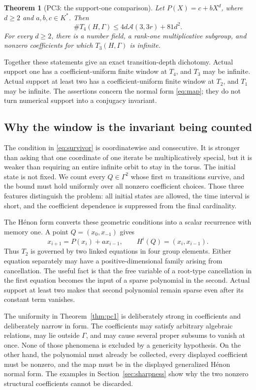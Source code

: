 \documentclass[11pt]{article}
\newtheorem{theorem}{Theorem}[section]
\theoremstyle{definition}
\newcommand{\Acal}{\mathcal A}
\newcommand{\card}{\#}
\begin{document}
\begin{theorem}[PC3: the support-one comparison]
\label{thm:pc3}
Let \(P(X)=c+bX^d\), where \(d\geq2\) and \(a,b,c\in K^*\). Then
\begin{equation}
 \boxed{
 \card T_4(H,\Gamma)
 \leq4d\Acal(3,3r)+81d^2.
 }
 \label{eq:pc3-bound}
\end{equation}
For every \(d\geq2\), there is a number field, a rank-one multiplicative subgroup, and nonzero coefficients for which \(T_3(H,\Gamma)\) is infinite.
\end{theorem}

Together these statements give an exact transition-depth dichotomy. Actual support one has a coefficient-uniform finite window at \(T_4\), and \(T_3\) may be infinite. Actual support at least two has a coefficient-uniform finite window at \(T_2\), and \(T_1\) may be infinite. The assertions concern the normal form \eqref{eq:map}; they do not turn numerical support into a conjugacy invariant.


\subsection{Why the window is the invariant being counted}

The condition in \eqref{eq:survivor} is coordinatewise and consecutive. It is stronger than asking that one coordinate of one iterate be multiplicatively special, but it is weaker than requiring an entire infinite orbit to stay in the torus. The initial state is not fixed. We count every \(Q\in\Gamma^2\) whose first \(m\) transitions survive, and the bound must hold uniformly over all nonzero coefficient choices. Those three features distinguish the problem: all initial states are allowed, the time interval is short, and the coefficient dependence is suppressed from the final cardinality.

The Hénon form converts these geometric conditions into a scalar recurrence with memory one. A point \(Q=(x_0,x_{-1})\) gives
\[
 x_{i+1}=P(x_i)+ax_{i-1},
 \qquad H^i(Q)=(x_i,x_{i-1}).
\]
Thus \(T_2\) is governed by two linked equations in four group elements. Either equation separately may have a positive-dimensional family arising from cancellation. The useful fact is that the free variable of a root-type cancellation in the first equation becomes the input of a sparse polynomial in the second. Actual support at least two makes that second polynomial remain sparse even after its constant term vanishes.

The uniformity in Theorem~\ref{thm:pc1} is deliberately strong in coefficients and deliberately narrow in form. The coefficients may satisfy arbitrary algebraic relations, may lie outside \(\Gamma\), and may cause several proper subsums to vanish at once. None of those phenomena is excluded by a genericity hypothesis. On the other hand, the polynomial must already be collected, every displayed coefficient must be nonzero, and the map must be in the displayed generalized Hénon normal form. The examples in Section~\ref{sec:sharpness} show why the two nonzero structural coefficients cannot be discarded.
\end{document}
